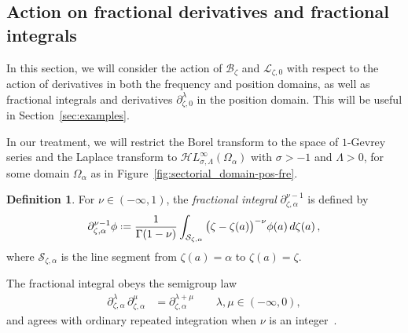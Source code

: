 \documentclass{article}
\newcommand{\singexp}[2]{\mathcal{H}L^\infty_{#1, #2}}
\newcommand{\fracderiv}[3]{\partial^{#1}_{#2, #3}}
\newcommand*{\defeq}{\mathrel{\vcenter{\baselineskip0.5ex \lineskiplimit0pt
                     \hbox{\scriptsize.}\hbox{\scriptsize.}}}%
                     =}
\newcommand{\laplace}{\mathcal{L}}
\newcommand{\borel}{\mathcal{B}}
\theoremstyle{definition}
\newtheorem{definition}{Definition}[section]
\theoremstyle{plain}
\begin{document}
\subsection{Action on fractional derivatives and fractional integrals}\label{sec:frac-diff-laplace}
In this section, we will consider the action of $\borel_\zeta$ and $\laplace_{\zeta,0}$ with respect to the action of derivatives in both the frequency and position domains, as well as fractional integrals and derivatives $\fracderiv{\lambda}{\zeta}{0}$ in the position domain. This will be useful in Section~\ref{sec:examples}. 

In our treatment, we will restrict the Borel transform to the space of $1$-Gevrey series and the Laplace transform to $\singexp{\sigma}{\Lambda}(\Omega_\alpha)$ with $\sigma>-1$ and $\Lambda>0$, for some domain $\Omega_\alpha$ as in Figure~\ref{fig:sectorial_domain-pos-fre}.
\begin{definition}
For $\nu \in (-\infty, 1)$, the \textit{fractional integral} $\partial^{\nu-1}_{\zeta, \alpha}$ is defined by
%
\[ \partial^{\nu-1}_{\zeta, \alpha} \phi \defeq \frac{1}{\Gamma(1-\nu)} \int_{\mathcal{S}_{\zeta,\alpha}} \big(\zeta-\zeta(a)\big)^{-\nu} \phi(a) \,d\zeta(a)\,, \]
where $\mathcal{S}_{\zeta,\alpha}$ is the line segment from $\zeta(a)=\alpha$ to $\zeta(a)=\zeta$.


\end{definition}
The fractional integral obeys the semigroup law \cite[Section  1.3]{mladenov2014advanced}
\begin{align*}
\fracderiv{\lambda}{\zeta}{\alpha}\,\fracderiv{\mu}{\zeta}{\alpha} & = \fracderiv{\lambda+\mu}{\zeta}{\alpha} \qquad \lambda, \mu \in (-\infty, 0),
\end{align*}
and agrees with ordinary repeated integration when $\nu$ is an integer~\cite[equation~35]{mladenov2014advanced}.
\end{document}
